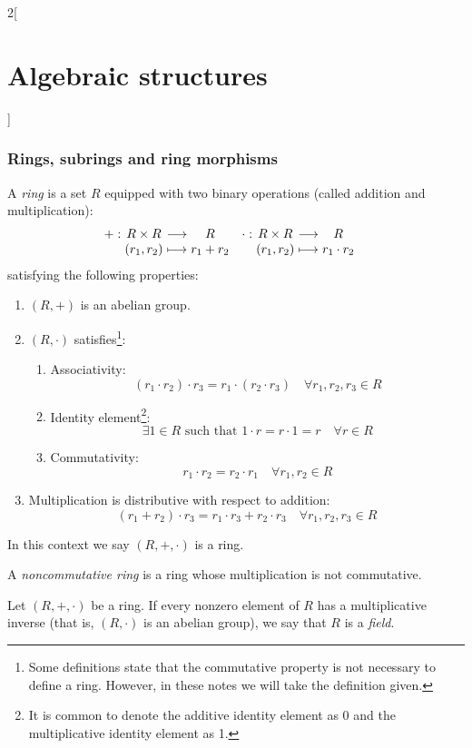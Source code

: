 \documentclass[../../../main_math.tex]{subfiles}
\begin{document}
\begin{multicols}{2}[\section{Algebraic structures}]
  \subsubsection{Rings, subrings and ring morphisms}
  \begin{definition}[Ring]
    A \emph{ring} is a set $R$ equipped with two binary operations (called addition and multiplication):
    \begin{align*}
      \function{+}{R\times R}{R}{(r_1,r_2)}{r_1+ r_2} & \function{\cdot}{R\times R}{R}{(r_1,r_2)}{r_1\cdot r_2}
    \end{align*}
    satisfying the following properties:
    \begin{enumerate}
      \item $(R,+)$ is an abelian group.
      \item $(R,\cdot)$ satisfies\footnote{Some definitions state that the commutative property is not necessary to define a ring. However, in these notes we will take the definition given.}:
            \begin{enumerate}
              \item Associativity: $$(r_1\cdot r_2)\cdot r_3=r_1\cdot(r_2\cdot r_3)\quad\forall r_1,r_2,r_3\in R$$
              \item Identity element\footnote{It is common to denote the additive identity element as 0 and the multiplicative identity element as 1.}: $$\exists 1\in R\text{ such that }1\cdot r=r\cdot 1=r\quad\forall r\in R$$
              \item Commutativity: $$r_1\cdot r_2=r_2\cdot r_1\quad\forall r_1,r_2\in R$$
            \end{enumerate}
      \item Multiplication is distributive with respect to addition: $$(r_1+r_2)\cdot r_3=r_1\cdot r_3+r_2\cdot r_3\quad\forall r_1,r_2,r_3\in R$$
    \end{enumerate}
    In this context we say $(R,+,\cdot)$ is a ring.
  \end{definition}
  \begin{definition}
    A \emph{noncommutative ring} is a ring whose multiplication is not commutative.
  \end{definition}
  \begin{definition}[Field]\label{AS:field}
    Let $(R,+,\cdot)$ be a ring. If every nonzero element of $R$ has a multiplicative inverse (that is, $(R,\cdot)$ is an abelian group), we say that $R$ is a \emph{field}.
  \end{definition}
  \begin{proposition}

\end{proposition}
\end{multicols}
\end{document}
